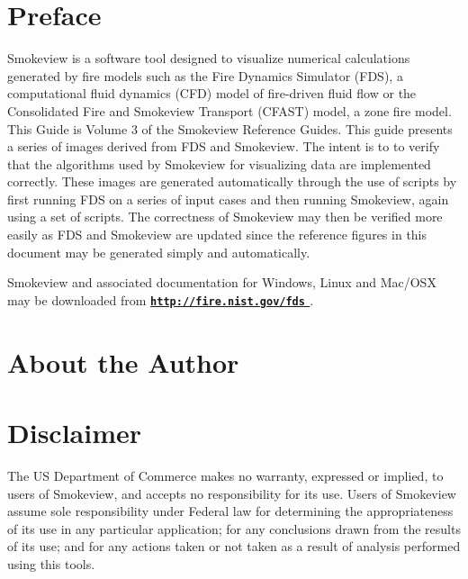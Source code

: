 \documentclass[11pt,twoside]{book}
\newcommand{\hhref}[1]{\href{#1}{{\tt #1}
}}
\begin{document}
\chapter{Preface}
Smokeview is a software tool designed to visualize numerical
calculations generated by fire models such as the Fire Dynamics Simulator (FDS),
a computational fluid dynamics (CFD) model of fire-driven fluid
flow or the Consolidated Fire and Smokeview Transport (CFAST) model, a zone fire model. This Guide is Volume 3 of the Smokeview Reference
Guides.
This guide presents a series of images derived from FDS and Smokeview.  The intent is to to verify that the algorithms used by Smokeview for visualizing data are implemented correctly.  These images are generated automatically through the use of scripts by first running FDS on a series of input cases and then running Smokeview, again using a set of scripts.  The correctness of Smokeview may then be verified more easily as FDS and Smokeview are updated since the reference figures in this document may be generated simply and automatically.

Smokeview and associated
documentation for Windows, Linux and Mac/OSX may be downloaded from  {\bf
\hhref{http://fire.nist.gov/fds}} .


\chapter{About the Author}
\begin{description}
\gforneybio
\end{description}


\chapter{Disclaimer}

The US Department of Commerce makes no warranty,
expressed or implied, to users of Smokeview, and accepts no
responsibility for its use. Users of Smokeview assume sole
responsibility under Federal law for determining the
appropriateness of its use in any particular application; for any
conclusions drawn from the results of its use; and for any actions
taken or not taken as a result of analysis performed using this
tools.
\end{document}
